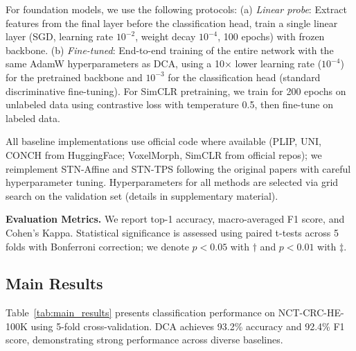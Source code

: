 \documentclass[10pt,journal,compsoc]{IEEEtran}
\begin{document}
For foundation models, we use the following protocols: (a) \textit{Linear probe}: Extract features from the final layer before the classification head, train a single linear layer (SGD, learning rate $10^{-2}$, weight decay $10^{-4}$, 100 epochs) with frozen backbone. (b) \textit{Fine-tuned}: End-to-end training of the entire network with the same AdamW hyperparameters as DCA, using a 10× lower learning rate ($10^{-4}$) for the pretrained backbone and $10^{-3}$ for the classification head (standard discriminative fine-tuning). For SimCLR pretraining, we train for 200 epochs on unlabeled data using contrastive loss with temperature 0.5, then fine-tune on labeled data.

All baseline implementations use official code where available (PLIP, UNI, CONCH from HuggingFace; VoxelMorph, SimCLR from official repos); we reimplement STN-Affine and STN-TPS following the original papers with careful hyperparameter tuning. Hyperparameters for all methods are selected via grid search on the validation set (details in supplementary material).

\textbf{Evaluation Metrics.} We report top-1 accuracy, macro-averaged F1 score, and Cohen's Kappa. Statistical significance is assessed using paired t-tests across 5 folds with Bonferroni correction; we denote $p < 0.05$ with $\dagger$ and $p < 0.01$ with $\ddagger$.

\subsection{Main Results}

Table~\ref{tab:main_results} presents classification performance on NCT-CRC-HE-100K using 5-fold cross-validation. DCA achieves 93.2\% accuracy and 92.4\% F1 score, demonstrating strong performance across diverse baselines.
\end{document}
